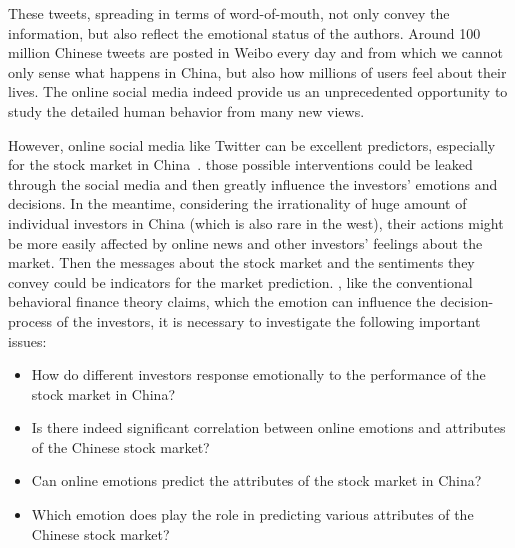 \documentclass[aps,preprint,groupedaddress]{revtex4-1}
\begin{document}
{\color{black}{There are a large number of tweets in popular platforms like Twitter and Weibo with explosive development of online social media.}} These tweets, spreading in terms of word-of-mouth, not only convey the {\color{black}{authentic}} information, but also reflect the emotional status of the authors. {\color{black}{For example, the development report from Weibo in 2015 officially shows the number of monthly active users is around 222 million.}} Around 100 million Chinese tweets are posted in Weibo every day and from which we cannot only sense what happens in China, but also how millions of users feel about their lives. The online social media indeed provide us an unprecedented opportunity to study the detailed human behavior from many new views.

{\color{black}{Investment decision and arbitrage model in the stock market attract much attention in recent decade.}} However, {\color{black}{there is much controversy as to whether}} online social media like Twitter can be excellent predictors, especially for the stock market in China~\cite{Bollen_predict_market,mao2014quantifying,wanyun2013investors}. {\color{black}{Different from western markets, the governmental intervention on the marketing regulations in China will introduce more non-market factors that might disturb the fluctuation of the stock market. Moreover,}} those possible interventions could be leaked through the social media and then greatly influence the investors' emotions and decisions. In the meantime, considering the irrationality of huge amount of individual {\color{black}{yet inexperienced}} investors in China (which is also rare in the west), their actions might be more easily affected by online news and other investors' feelings about the market. Then the messages about the stock market and the sentiments they convey could be {\color{black}{promising}} indicators for the market prediction. {\color{black}{Therefore}}, like the conventional behavioral finance theory claims, which the emotion can influence the decision-process of the investors, it is necessary to investigate the following important issues:
\begin{itemize}
\item How do different investors response emotionally to the performance of the stock market in China?
\item Is there indeed significant correlation between online emotions and attributes of the Chinese stock market?
\item Can online emotions predict the attributes of the stock market in China?
\item Which emotion does play the role in predicting various attributes of the Chinese stock market?
\end{itemize}
\end{document}
